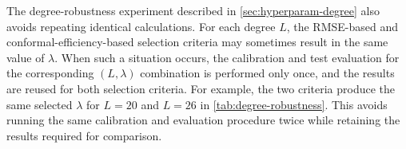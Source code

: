 The degree-robustness experiment described in \cref{sec:hyperparam-degree} also avoids repeating identical calculations. For each degree $L$, the RMSE-based and conformal-efficiency-based selection criteria may sometimes result in the same value of $\lambda$. When such a situation occurs, the calibration and test evaluation for the corresponding $(L,\lambda)$ combination is performed only once, and the results are reused for both selection criteria. For example, the two criteria produce the same selected $\lambda$ for $L=20$ and $L=26$ in \cref{tab:degree-robustness}. This avoids running the same calibration and evaluation procedure twice while retaining the results required for comparison.

